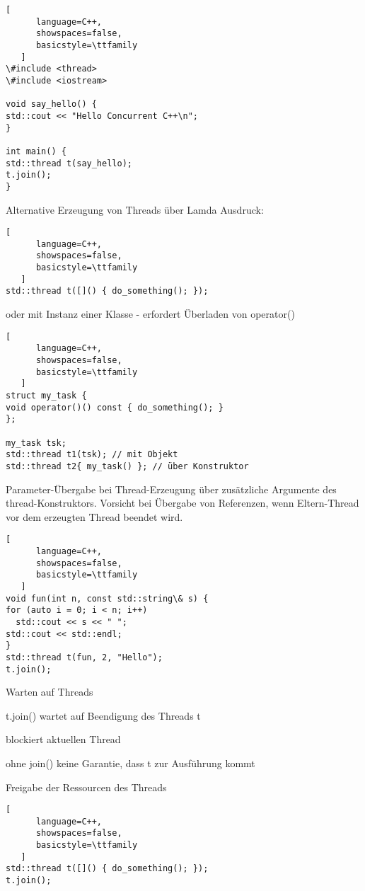 \documentclass[10pt]{article}
\begin{document}
\begin{lstlisting}[
      language=C++,
      showspaces=false,
      basicstyle=\ttfamily
   ]
\#include <thread>
\#include <iostream>

void say_hello() {
std::cout << "Hello Concurrent C++\n";
}

int main() {
std::thread t(say_hello);
t.join();
}
\end{lstlisting}

Alternative Erzeugung von Threads über Lamda Ausdruck: 
\begin{lstlisting}[
      language=C++,
      showspaces=false,
      basicstyle=\ttfamily
   ]
std::thread t([]() { do_something(); });
\end{lstlisting}

oder mit Instanz einer Klasse - erfordert Überladen von operator()
\begin{lstlisting}[
      language=C++,
      showspaces=false,
      basicstyle=\ttfamily
   ]
struct my_task {
void operator()() const { do_something(); }
};

my_task tsk;
std::thread t1(tsk); // mit Objekt
std::thread t2{ my_task() }; // über Konstruktor
\end{lstlisting}


Parameter-Übergabe bei Thread-Erzeugung über zusätzliche Argumente des thread-Konstruktors. Vorsicht bei Übergabe von Referenzen, wenn
Eltern-Thread vor dem erzeugten Thread beendet wird.
\begin{lstlisting}[
      language=C++,
      showspaces=false,
      basicstyle=\ttfamily
   ]
void fun(int n, const std::string\& s) {
for (auto i = 0; i < n; i++)
  std::cout << s << " ";
std::cout << std::endl;
}
std::thread t(fun, 2, "Hello");
t.join();
\end{lstlisting}


Warten auf Threads
\begin{itemize*}
  \item t.join() wartet auf Beendigung des Threads t
  \item blockiert aktuellen Thread
  \item ohne join() keine Garantie, dass t zur Ausführung kommt
  \item Freigabe der Ressourcen des Threads
\end{itemize*}
\begin{lstlisting}[
      language=C++,
      showspaces=false,
      basicstyle=\ttfamily
   ]
std::thread t([]() { do_something(); });
t.join();
\end{lstlisting}
\end{document}
